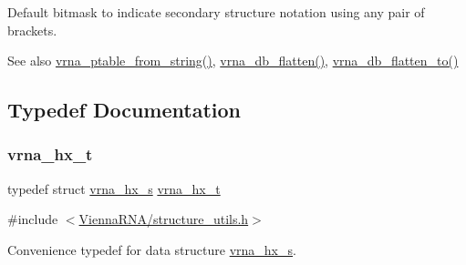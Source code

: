 Default bitmask to indicate secondary structure notation using any pair of brackets. 

\begin{DoxySeeAlso}{See also}
\mbox{\hyperlink{group__struct__utils_gac76c9ef3de507748fb0416a59323362b}{vrna\+\_\+ptable\+\_\+from\+\_\+string()}}, \mbox{\hyperlink{group__struct__utils_gae966b9f44168a4f4b39ca42ffb5f37b7}{vrna\+\_\+db\+\_\+flatten()}}, \mbox{\hyperlink{group__struct__utils_ga690425199c8b71545e7196e3af1436f8}{vrna\+\_\+db\+\_\+flatten\+\_\+to()}} 
\end{DoxySeeAlso}


\subsection{Typedef Documentation}
\mbox{\label{group__struct__utils_ga877363f3a1703b53ecd025c6fcf897a0}} 
\subsubsection{\texorpdfstring{vrna\+\_\+hx\+\_\+t}{vrna\_hx\_t}}
{\footnotesize\ttfamily typedef struct \mbox{\hyperlink{group__struct__utils_structvrna__hx__s}{vrna\+\_\+hx\+\_\+s}} \mbox{\hyperlink{group__struct__utils_ga877363f3a1703b53ecd025c6fcf897a0}{vrna\+\_\+hx\+\_\+t}}}



{\ttfamily \#include $<$\mbox{\hyperlink{structure__utils_8h}{Vienna\+R\+N\+A/structure\+\_\+utils.\+h}}$>$}



Convenience typedef for data structure \mbox{\hyperlink{group__struct__utils_structvrna__hx__s}{vrna\+\_\+hx\+\_\+s}}. 

\mbox{\label{group__struct__utils_gab9ac98ab55ded9fb90043b024b915aca}} 
